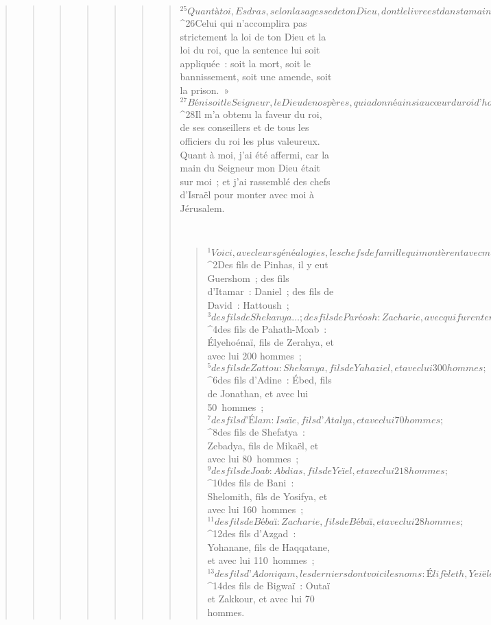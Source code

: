 \begin{verse}
\begin{verse}
\begin{verse}
\begin{verse}
\begin{verse}
\begin{verse}
\begin{verse}
${}^{25}Quant à toi, Esdras, selon la sagesse de ton Dieu, dont le livre est dans ta main, établis des juges et des magistrats qui exercent la justice pour tout le peuple de Transeuphratène et pour tous ceux qui connaissent les lois de ton Dieu ; et à ceux qui ne les connaissent pas, vous les ferez connaître.
${}^{26}Celui qui n’accomplira pas strictement la loi de ton Dieu et la loi du roi, que la sentence lui soit appliquée : soit la mort, soit le bannissement, soit une amende, soit la prison. »
${}^{27}Béni soit le Seigneur, le Dieu de nos pères, qui a donné ainsi au cœur du roi d’honorer la maison du Seigneur à Jérusalem. 
${}^{28}Il m’a obtenu la faveur du roi, de ses conseillers et de tous les officiers du roi les plus valeureux. Quant à moi, j’ai été affermi, car la main du Seigneur mon Dieu était sur moi ; et j’ai rassemblé des chefs d’Israël pour monter avec moi à Jérusalem.
      
         
      \bchapter{}
      \begin{verse}
${}^{1}Voici, avec leurs généalogies, les chefs de famille qui montèrent avec moi de Babylone, sous le règne du roi Artaxerxès : 
${}^{2}Des fils de Pinhas, il y eut Guershom ; des fils d’Itamar : Daniel ; des fils de David : Hattoush ; 
${}^{3}des fils de Shekanya… ; des fils de Paréosh : Zacharie, avec qui furent enregistrés 150 hommes ; 
${}^{4}des fils de Pahath-Moab : Élyehoénaï, fils de Zerahya, et avec lui 200 hommes ; 
${}^{5}des fils de Zattou : Shekanya, fils de Yahaziel, et avec lui 300 hommes ; 
${}^{6}des fils d’Adine : Ébed, fils de Jonathan, et avec lui 50 hommes ; 
${}^{7}des fils d’Élam : Isaïe, fils d’Atalya, et avec lui 70 hommes ; 
${}^{8}des fils de Shefatya : Zebadya, fils de Mikaël, et avec lui 80 hommes ; 
${}^{9}des fils de Joab : Abdias, fils de Yeïel, et avec lui 218 hommes ; 
${}^{10}des fils de Bani : Shelomith, fils de Yosifya, et avec lui 160 hommes ; 
${}^{11}des fils de Bébaï : Zacharie, fils de Bébaï, et avec lui 28 hommes ; 
${}^{12}des fils d’Azgad : Yohanane, fils de Haqqatane, et avec lui 110 hommes ; 
${}^{13}des fils d’Adoniqam, les derniers dont voici les noms : Élifèleth, Yeiël et Shemaya, et avec eux 60 hommes ; 
${}^{14}des fils de Bigwaï : Outaï et Zakkour, et avec lui 70 hommes.
      

\end{verse}
\end{verse}
\end{verse}
\end{verse}
\end{verse}
\end{verse}
\end{verse}
\end{verse}

